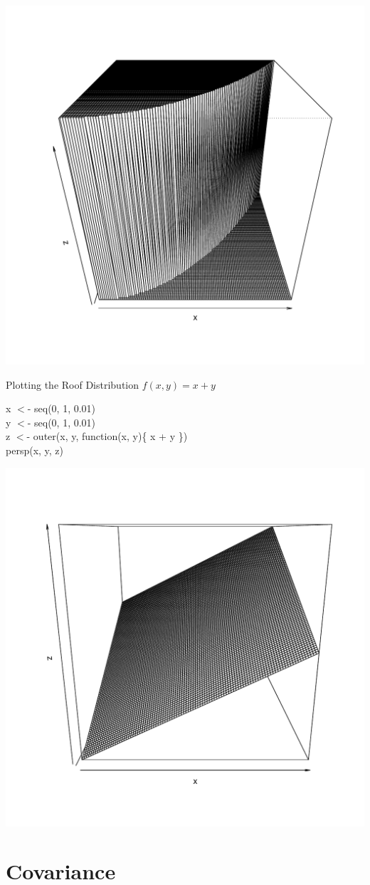\documentclass[aspectratio=169, handout]{beamer}
\numberwithin{equation}{section}
\begin{document}
\begin{frame}
\begin{center}
\includegraphics[width=3 in]{images/halfcircle.pdf}
\end{center}
\end{frame}


\begin{frame}{Plotting the Roof Distribution $f(x,y)=x+y$}

x $<$- seq(0, 1, 0.01)\\
y $<$- seq(0, 1, 0.01)\\
z $<$- outer(x, y, function(x, y)\{ x + y \})\\
persp(x, y, z)

\end{frame}


\begin{frame}
\begin{center}
\includegraphics[width=3 in]{images/roof.pdf}
\end{center}
\end{frame}

\section{Covariance}
\end{document}
